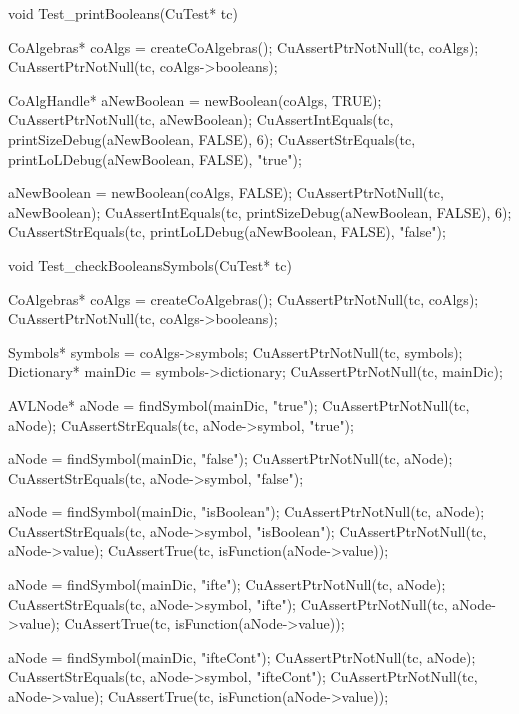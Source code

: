 void Test_printBooleans(CuTest* tc) {
  CoAlgebras* coAlgs = createCoAlgebras();
  CuAssertPtrNotNull(tc, coAlgs);
  CuAssertPtrNotNull(tc, coAlgs->booleans);

  CoAlgHandle* aNewBoolean = newBoolean(coAlgs, TRUE);
  CuAssertPtrNotNull(tc, aNewBoolean);
  CuAssertIntEquals(tc, printSizeDebug(aNewBoolean, FALSE), 6);
  CuAssertStrEquals(tc, printLoLDebug(aNewBoolean, FALSE), "true");

  aNewBoolean = newBoolean(coAlgs, FALSE);
  CuAssertPtrNotNull(tc, aNewBoolean);
  CuAssertIntEquals(tc, printSizeDebug(aNewBoolean, FALSE), 6);
  CuAssertStrEquals(tc, printLoLDebug(aNewBoolean, FALSE), "false");
}

void Test_checkBooleansSymbols(CuTest* tc) {
  CoAlgebras* coAlgs = createCoAlgebras();
  CuAssertPtrNotNull(tc, coAlgs);
  CuAssertPtrNotNull(tc, coAlgs->booleans);

  Symbols* symbols = coAlgs->symbols;
  CuAssertPtrNotNull(tc, symbols);
  Dictionary* mainDic = symbols->dictionary;
  CuAssertPtrNotNull(tc, mainDic);

  AVLNode* aNode = findSymbol(mainDic, "true");
  CuAssertPtrNotNull(tc, aNode);
  CuAssertStrEquals(tc, aNode->symbol, "true");

  aNode = findSymbol(mainDic, "false");
  CuAssertPtrNotNull(tc, aNode);
  CuAssertStrEquals(tc, aNode->symbol, "false");

  aNode = findSymbol(mainDic, "isBoolean");
  CuAssertPtrNotNull(tc, aNode);
  CuAssertStrEquals(tc, aNode->symbol, "isBoolean");
  CuAssertPtrNotNull(tc, aNode->value);
  CuAssertTrue(tc, isFunction(aNode->value));

  aNode = findSymbol(mainDic, "ifte");
  CuAssertPtrNotNull(tc, aNode);
  CuAssertStrEquals(tc, aNode->symbol, "ifte");
  CuAssertPtrNotNull(tc, aNode->value);
  CuAssertTrue(tc, isFunction(aNode->value));

  aNode = findSymbol(mainDic, "ifteCont");
  CuAssertPtrNotNull(tc, aNode);
  CuAssertStrEquals(tc, aNode->symbol, "ifteCont");
  CuAssertPtrNotNull(tc, aNode->value);
  CuAssertTrue(tc, isFunction(aNode->value));
}

\stoptyping

\stopJoyLoLWord